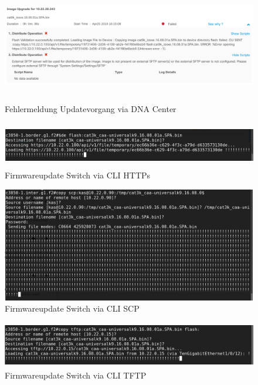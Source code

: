 \begin{figure}[H]
	\centering
	\includegraphics[height=5cm]{img/updates/Selection_071.png}
	\caption{Fehlermeldung Updatevorgang via DNA Center}
	\label{fig:dna-center-provision-updates-1}
\end{figure}

\begin{figure}[H]
	\centering
	\includegraphics[height=2cm]{img/updates/Selection_082.png}
	\caption{Firmwareupdate Switch via CLI HTTPs}
	\label{fig:dna-center-provision-updates-2}
\end{figure}

\begin{figure}[H]
	\centering
	\includegraphics[height=5cm]{img/updates/Selection_108.png}
	\caption{Firmwareupdate Switch via CLI SCP}
	\label{fig:dna-center-provision-updates-3}
\end{figure}

\begin{figure}[H]
	\centering
	\includegraphics[height=2cm]{img/updates/Selection_111.png}
	\caption{Firmwareupdate Switch via CLI TFTP}
	\label{fig:dna-center-provision-updates-4}
\end{figure}

